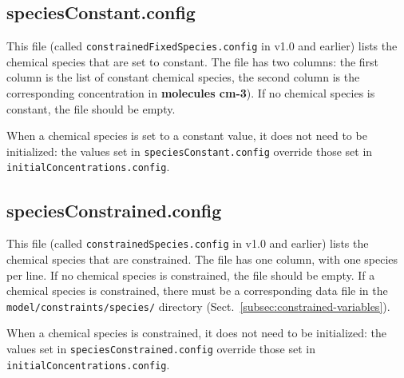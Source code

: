 \subsection{speciesConstant.config} \label{subsec:speciesconstant}

This file (called \texttt{constrainedFixedSpecies.config} in v1.0 and
earlier) lists the chemical species that are set to constant. The file has
two columns: the first column is the list of constant chemical species, the
second column is the corresponding concentration in \textbf{molecules cm-3}).
If no chemical species is constant, the file should be empty.

When a chemical species is set to a constant value, it does not need
to be initialized: the values set in \texttt{speciesConstant.config}
override those set in \texttt{initialConcentrations.config}.

\subsection{speciesConstrained.config} \label{subsec:speciesconstrained}

This file (called \texttt{constrainedSpecies.config} in v1.0 and
earlier) lists the chemical species that are constrained. The file has
one column, with one species per line. If no chemical species is
constrained, the file should be empty. If a chemical species is
constrained, there must be a corresponding data file in the
\texttt{model/constraints/species/} directory
(Sect.~\ref{subsec:constrained-variables}).

When a chemical species is constrained, it does not need to be
initialized: the values set in \texttt{speciesConstrained.config}
override those set in \texttt{initialConcentrations.config}.
